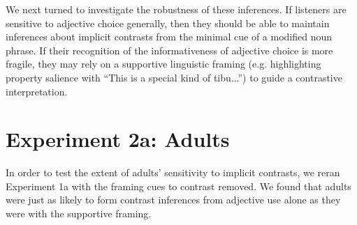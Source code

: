 \documentclass[10pt,letterpaper]{article}
\begin{document}
We next turned to investigate the robustness of these inferences.  If listeners are sensitive to adjective choice generally, then they should be able to maintain inferences about implicit contrasts from the minimal cue of a modified noun phrase.  If their recognition of the informativeness of adjective choice is more fragile, they may rely on a supportive linguistic framing (e.g. highlighting property salience with ``This is a special kind of tibu...'') to guide a contrastive interpretation. 




\section{Experiment 2a: Adults} 


In order to test the extent of adults' sensitivity to implicit contrasts, we reran Experiment 1a with the framing cues to contrast removed.  We found that adults were just as likely to form contrast inferences from adjective use alone as they were with the supportive framing. 
\end{document}
